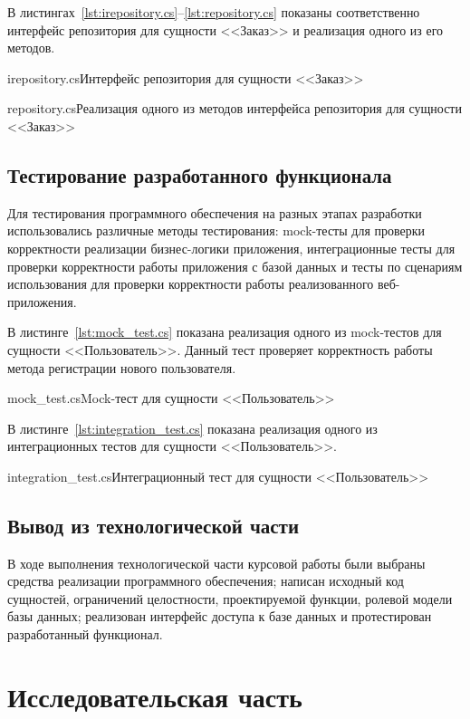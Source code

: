 \documentclass{bmstu}
\begin{document}
В листингах~\ref{lst:irepository.cs}--\ref{lst:repository.cs} показаны соответственно интерфейс репозитория для сущности <<Заказ>> и реализация одного из его методов.

{irepository.cs}{Интерфейс репозитория для сущности <<Заказ>>}

{repository.cs}{Реализация одного из методов интерфейса репозитория для сущности <<Заказ>>}

\section{Тестирование разработанного функционала}

Для тестирования программного обеспечения на разных этапах разработки использовались различные методы тестирования: mock-тесты для проверки корректности реализации бизнес-логики приложения, интеграционные тесты для проверки корректности работы приложения с базой данных и тесты по сценариям использования для проверки корректности работы реализованного веб-приложения. 

В листинге~\ref{lst:mock_test.cs} показана реализация одного из mock-тестов для сущности <<Пользователь>>. 
Данный тест проверяет корректность работы метода регистрации нового пользователя.

{mock_test.cs}{Mock-тест для сущности <<Пользователь>>}

В листинге~\ref{lst:integration_test.cs} показана реализация одного из интеграционных тестов для сущности <<Пользователь>>.

{integration_test.cs}{Интеграционный тест для сущности <<Пользователь>>}

\section*{Вывод из технологической части}

В ходе выполнения технологической части курсовой работы были выбраны средства реализации программного обеспечения; написан исходный код сущностей, ограничений целостности, проектируемой функции, ролевой модели базы данных; реализован интерфейс доступа к базе данных и протестирован разработанный функционал.

\chapter{Исследовательская часть}
\end{document}
